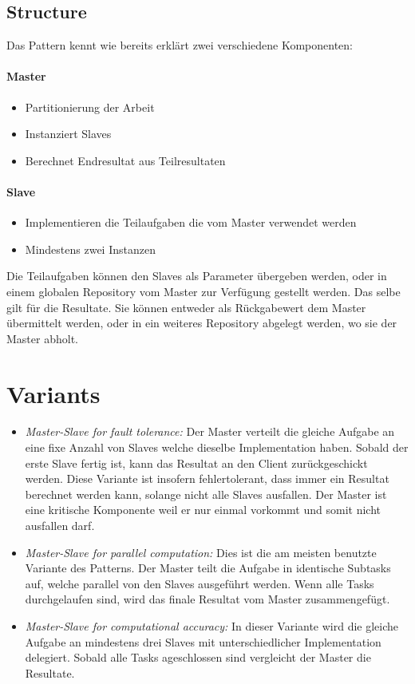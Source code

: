 \subsection{Structure}
Das Pattern kennt wie bereits erklärt zwei verschiedene Komponenten:
\paragraph{Master} 
\begin{itemize}
	\item Partitionierung der Arbeit
	\item Instanziert Slaves
	\item Berechnet Endresultat aus Teilresultaten
\end{itemize}
\paragraph{Slave}
\begin{itemize}
	\item Implementieren die Teilaufgaben die vom Master verwendet werden
	\item Mindestens zwei Instanzen
\end{itemize}
Die Teilaufgaben können den Slaves als Parameter übergeben werden, oder in einem globalen Repository vom Master zur Verfügung gestellt werden. Das selbe gilt für die Resultate. Sie können entweder als Rückgabewert dem Master übermittelt werden, oder in ein weiteres Repository abgelegt werden, wo sie der Master abholt.

\section{Variants}
\begin{itemize}
	\item \textit{Master-Slave for fault tolerance:} Der Master verteilt die gleiche Aufgabe an eine fixe Anzahl von Slaves welche dieselbe Implementation haben. Sobald der erste Slave fertig ist, kann das Resultat an den Client zurückgeschickt werden. Diese Variante ist insofern fehlertolerant, dass immer ein Resultat berechnet werden kann, solange nicht alle Slaves ausfallen. Der Master ist eine kritische Komponente weil er nur einmal vorkommt und somit nicht ausfallen darf.
	
	\item \textit{Master-Slave for parallel computation:} Dies ist die am meisten benutzte Variante des Patterns. Der Master teilt die Aufgabe in identische Subtasks auf, welche parallel von den Slaves ausgeführt werden. Wenn alle Tasks durchgelaufen sind, wird das finale Resultat vom Master zusammengefügt.
	
	\item \textit{Master-Slave for computational accuracy:} In dieser Variante wird die gleiche Aufgabe an mindestens drei Slaves mit unterschiedlicher Implementation delegiert. 
	Sobald alle Tasks ageschlossen sind vergleicht der Master die Resultate.
\end{itemize}

